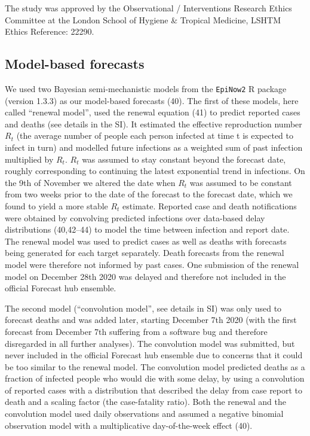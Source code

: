 \documentclass[
]{article}
\begin{document}
The study was approved by the Observational / Interventions Research Ethics Committee at the London School of Hygiene \& Tropical Medicine, LSHTM Ethics Reference: 22290.

\hypertarget{model-based-forecasts}{%
\subsection{Model-based forecasts}\label{model-based-forecasts}}

We used two Bayesian semi-mechanistic models from the \texttt{EpiNow2} R package (version 1.3.3) as our model-based forecasts (40). The first of these models, here called ``renewal model'', used the renewal equation (41) to predict reported cases and deaths (see details in the SI). It estimated the effective reproduction number \(R_t\) (the average number of people each person infected at time t is expected to infect in turn) and modelled future infections as a weighted sum of past infection multiplied by \(R_t\). \(R_t\) was assumed to stay constant beyond the forecast date, roughly corresponding to continuing the latest exponential trend in infections. On the 9th of November we altered the date when \(R_t\) was assumed to be constant from two weeks prior to the date of the forecast to the forecast date, which we found to yield a more stable \(R_t\) estimate. Reported case and death notifications were obtained by convolving predicted infections over data-based delay distributions (40,42--44) to model the time between infection and report date. The renewal model was used to predict cases as well as deaths with forecasts being generated for each target separately. Death forecasts from the renewal model were therefore not informed by past cases. One submission of the renewal model on December 28th 2020 was delayed and therefore not included in the official Forecast hub ensemble.

The second model (``convolution model'', see details in SI) was only used to forecast deaths and was added later, starting December 7th 2020 (with the first forecast from December 7th suffering from a software bug and therefore disregarded in all further analyses). The convolution model was submitted, but never included in the official Forecast hub ensemble due to concerns that it could be too similar to the renewal model. The convolution model predicted deaths as a fraction of infected people who would die with some delay, by using a convolution of reported cases with a distribution that described the delay from case report to death and a scaling factor (the case-fatality ratio). Both the renewal and the convolution model used daily observations and assumed a negative binomial observation model with a multiplicative day-of-the-week effect (40).
\end{document}
